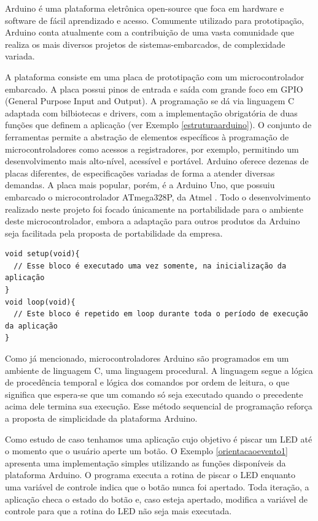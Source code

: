\documentclass{article}
\begin{document}
\tab Arduino é uma plataforma eletrônica open-source que foca em hardware e software de fácil aprendizado e acesso. Comumente utilizado para prototipação, Arduino conta atualmente com a contribuição de uma vasta comunidade que realiza os mais diversos projetos de sistemas-embarcados, de complexidade variada. \cite{arduinoblog}
\par A plataforma consiste em uma placa de prototipação com um microcontrolador embarcado. A placa possui pinos de entrada e saída com grande foco em GPIO (General Purpose Input and Output). A programação se dá via linguagem C adaptada com bilbiotecas e drivers, com a implementação obrigatória de duas funções que definem a aplicação (ver Exemplo \ref{estruturaarduino}). O conjunto de ferramentas permite a abstração de elementos específicos à programação de microcontroladores como acessos a registradores, por exemplo, permitindo um desenvolvimento mais alto-nível, acessível e portável. Arduino oferece dezenas de placas diferentes, de especificações variadas de forma a atender diversas demandas. A placa mais popular, porém, é a Arduino Uno, que possuiu embarcado o microcontrolador ATmega328P, da Atmel \cite{atmegadatasheet}. Todo o desenvolvimento realizado neste projeto foi focado únicamente na portabilidade para o ambiente deste microcontrolador, embora a adaptação para outros produtos da Arduino seja facilitada pela proposta de portabilidade da empresa.
\begin{lstlisting}[style=CStyle,label=estruturaarduino,caption=Estrutura de uma aplicação Arduino]
void setup(void){
  // Esse bloco é executado uma vez somente, na inicialização da aplicação
}
void loop(void){
  // Este bloco é repetido em loop durante toda o período de execução da aplicação
}
\end{lstlisting}
\par Como já mencionado, microcontroladores Arduino são programados em um ambiente de linguagem C, uma linguagem procedural. A linguagem segue a lógica de procedência temporal e lógica dos comandos por ordem de leitura, o que significa que espera-se que um comando só seja executado quando o precedente acima dele termina sua execução. Esse método sequencial de programação reforça a proposta de simplicidade da plataforma Arduino. 
\par Como estudo de caso tenhamos uma aplicação cujo objetivo é piscar um LED até o momento que o usuário aperte um botão. O Exemplo \ref{orientacaoevento1} apresenta uma implementação simples utilizando as funções disponíveis da plataforma Arduino. O programa executa a rotina de piscar o LED enquanto uma variável de controle indica que o botão nunca foi apertado. Toda iteração, a aplicação checa o estado do botão e, caso esteja apertado, modifica a variável de controle para que a rotina do LED não seja mais executada.
\end{document}
